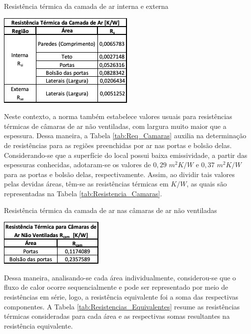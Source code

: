 \documentclass[acronym,symbols,table]{fei}
\begin{document}
\begin{table}[!htb] 
 \centering
    \caption{Resistência térmica da camada de ar interna e externa}
    \includegraphics[width=0.4\linewidth]{Tabelas/Resistencia_NBR15220.png}
    \label{tab:Resistencia_NBR15220}
\end{table}

Neste contexto, a norma \textcite{abnt15220} também estabelece valores usuais para resistências térmicas de câmaras de ar não ventiladas, com largura muito maior que a espessura. Dessa maneira, a Tabela \ref{tab:Req_Camaras} auxilia na determinação de resistências para as regiões preenchidas por ar nas portas e bolsão delas. Considerando-se que a superfície do local possui baixa emissividade, a partir das espessuras conhecidas, adotaram-se os valores de $0,29$ $m^2K/W$ e $0,37$ $m^2K/W$ para as portas e bolsão delas, respectivamente. Assim, ao dividir tais valores pelas devidas áreas, têm-se as resistências térmicas em $K/W$, as quais são representadas na Tabela \ref{tab:Resistencia_Camaras}.

\begin{table}[!htb] 
 \centering
    \caption{Resistência térmica da camada de ar nas câmaras de ar não ventiladas}
    \includegraphics[width=0.4\linewidth]{Tabelas/Resistencia_Camaras.png}
    \label{tab:Resistencia_Camaras}
\end{table}

Dessa maneira, analisando-se cada área individualmente, considerou-se que o fluxo de calor ocorre sequencialmente e pode ser representado por meio de resistências em série, logo, a resistência equivalente foi a soma das respectivas componentes. A Tabela \ref{tab:Resistencias_Equivalentes} resume as resistências térmicas consideradas para cada área e as respectivas somas resultantes na resistência equivalente.
\end{document}
